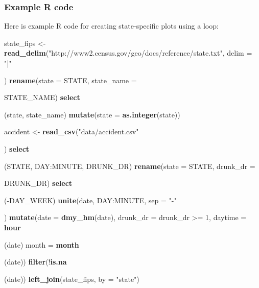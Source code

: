 \documentclass[]{book}
\makeatletter
\newenvironment{Shaded}{\begin{snugshade}}{\end{snugshade}}
\newcommand{\KeywordTok}[1]{\textcolor[rgb]{0.13,0.29,0.53}{\textbf{{#1}}}}
\newcommand{\DataTypeTok}[1]{\textcolor[rgb]{0.13,0.29,0.53}{{#1}}}
\newcommand{\DecValTok}[1]{\textcolor[rgb]{0.00,0.00,0.81}{{#1}}}
\newcommand{\StringTok}[1]{\textcolor[rgb]{0.31,0.60,0.02}{{#1}}}
\newcommand{\NormalTok}[1]{{#1}}
\newenvironment{kframe}{%
\medskip{}
\setlength{\fboxsep}{.8em}
 \def\at@end@of@kframe{}%
 \ifinner\ifhmode%
  \def\at@end@of@kframe{\end{minipage}}%
  \begin{minipage}{\columnwidth}%
 \fi\fi%
 \def\FrameCommand##1{\hskip\@totalleftmargin \hskip-\fboxsep
 \colorbox{shadecolor}{##1}\hskip-\fboxsep
     \hskip-\linewidth \hskip-\@totalleftmargin \hskip\columnwidth}%
 \MakeFramed {\advance\hsize-\width
   \@totalleftmargin\z@ \linewidth\hsize
   \@setminipage}}%
 {\par\unskip\endMakeFramed%
 \at@end@of@kframe}
\renewenvironment{Shaded}{\begin{kframe}}{\end{kframe}}
\makeatother
\begin{document}
\subsubsection{Example R code}\label{example-r-code-11}

Here is example R code for creating state-specific plots using a loop:

\begin{Shaded}
\begin{Highlighting}[]
\NormalTok{state_fips <-}\StringTok{ }\KeywordTok{read_delim}\NormalTok{(}\StringTok{"http://www2.census.gov/geo/docs/reference/state.txt"}\NormalTok{,}
                         \DataTypeTok{delim =} \StringTok{"|"}\NormalTok{) %
\StringTok{  }\KeywordTok{rename}\NormalTok{(}\DataTypeTok{state =} \NormalTok{STATE,}
         \DataTypeTok{state_name =} \NormalTok{STATE_NAME) %
\StringTok{  }\KeywordTok{select}\NormalTok{(state, state_name) %
\StringTok{  }\KeywordTok{mutate}\NormalTok{(}\DataTypeTok{state =} \KeywordTok{as.integer}\NormalTok{(state))}

\NormalTok{accident <-}\StringTok{ }\KeywordTok{read_csv}\NormalTok{(}\StringTok{"data/accident.csv"}\NormalTok{) %
\StringTok{  }\KeywordTok{select}\NormalTok{(STATE, DAY:MINUTE, DRUNK_DR) %
\StringTok{  }\KeywordTok{rename}\NormalTok{(}\DataTypeTok{state =} \NormalTok{STATE, }
         \DataTypeTok{drunk_dr =} \NormalTok{DRUNK_DR) %
\StringTok{  }\KeywordTok{select}\NormalTok{(-DAY_WEEK) %
\StringTok{  }\KeywordTok{unite}\NormalTok{(date, DAY:MINUTE, }\DataTypeTok{sep =} \StringTok{"-"}\NormalTok{) %
\StringTok{  }\KeywordTok{mutate}\NormalTok{(}\DataTypeTok{date =} \KeywordTok{dmy_hm}\NormalTok{(date), }
         \DataTypeTok{drunk_dr =} \NormalTok{drunk_dr >=}\StringTok{ }\DecValTok{1}\NormalTok{,}
         \DataTypeTok{daytime =} \KeywordTok{hour}\NormalTok{(date) %
         \DataTypeTok{month =} \KeywordTok{month}\NormalTok{(date)) %
\StringTok{  }\KeywordTok{filter}\NormalTok{(!}\KeywordTok{is.na}\NormalTok{(date)) %
\StringTok{  }\KeywordTok{left_join}\NormalTok{(state_fips, }\DataTypeTok{by =} \StringTok{"state"}\NormalTok{)}

}}}}}}}}}}}
\end{Highlighting}
\end{Shaded}
\end{document}
